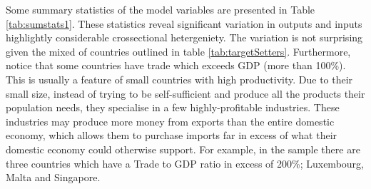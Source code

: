 \documentclass[
  12pt,
]{article}
\begin{document}
Some summary statistics of the model variables are presented in Table \ref{tab:sumstats1}. These statistics reveal significant variation in outputs and inputs highlightly considerable crossectional hetergeniety. The variation is not surprising given the mixed of countries outlined in table \ref{tab:targetSetters}. Furthermore, notice that some countries have trade which exceeds GDP (more than 100\%). This is usually a feature of small countries with high productivity. Due to their small size, instead of trying to be self-sufficient and produce all the products their population needs, they specialise in a few highly-profitable industries. These industries may produce more money from exports than the entire domestic economy, which allows them to purchase imports far in excess of what their domestic economy could otherwise support. For example, in the sample there are three countries which have a Trade to GDP ratio in excess of 200\%; Luxembourg, Malta and Singapore.
\end{document}
